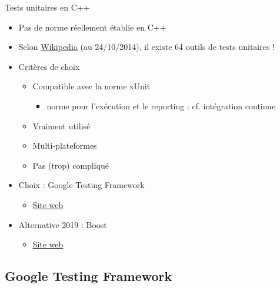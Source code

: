 \begin{frame}{Tests unitaires en C++}
\begin{itemize}
\item Pas de norme réellement établie en C++
\item Selon \href{http://en.wikipedia.org/wiki/List_of_unit_testing_frameworks}{Wikipedia} (au 24/10/2014), il existe 64 outils de tests unitaires !
\item Critères de choix
\begin{itemize}
\item Compatible avec la norme xUnit
\begin{itemize}
  \item norme pour l'exécution et le reporting : cf. intégration continue
\end{itemize}
\item Vraiment utilisé
\item Multi-plateformes
\item Pas (trop) compliqué
\end{itemize}
\pause\item Choix : Google Testing Framework
\begin{itemize}
\item \href{https://code.google.com/p/googletest/}{Site web}
\end{itemize}
\pause\item Alternative 2019 : Boost
\begin{itemize}
\item \href{https://www.boost.org}{Site web}
\end{itemize}
\end{itemize}
\end{frame}



\subsection{Google Testing Framework}\label{google-testing-framework}

